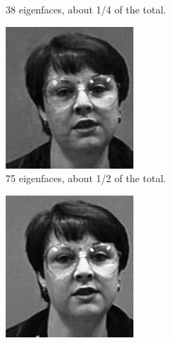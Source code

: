 \begin{figure}
\begin{subfigure}[b]{0.3\textwidth}
\caption{38 eigenfaces, about 1/4 of the total.}
\label{fig:38_efaces}
\end{subfigure}
\begin{subfigure}[b]{0.3\textwidth}
\includegraphics[width=\textwidth]{rebuiltHalf.png}
\caption{75 eigenfaces, about 1/2 of the total.}
\label{fig:75_efaces}
\end{subfigure}
\begin{subfigure}[b]{0.3\textwidth}
\includegraphics[width=\textwidth]{rebuiltAll.png}

\end{subfigure}
\end{figure}
